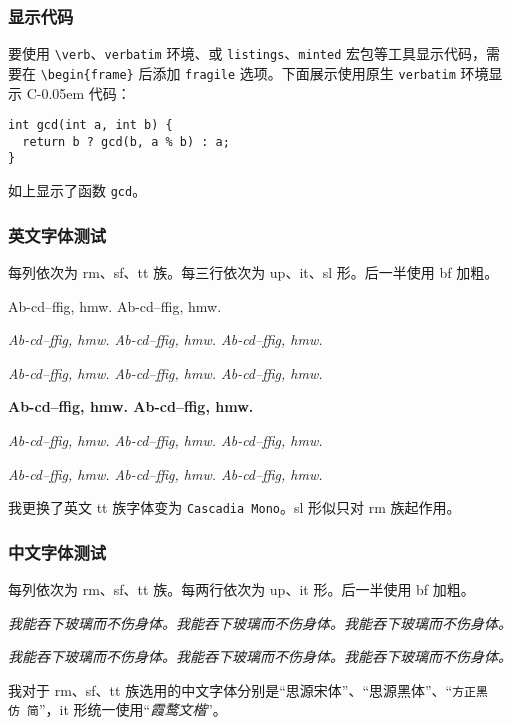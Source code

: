 \documentclass{../pkslide}
\newcommand{\Cpp}{\texorpdfstring{C\kern-0.05em\protect\raisebox{.35ex}{\textsmaller[2]{+\kern-0.05em+}}}{C++}}
\begin{document}
\begin{frame}[fragile]
  \frametitle{显示代码}
  
  要使用 \verb|\verb|、\verb|verbatim| 环境、或 \verb|listings|、\verb|minted| 宏包等工具显示代码，需要在 \verb|\begin{frame}| 后添加 \verb|fragile| 选项。下面展示使用原生 \verb|verbatim| 环境显示 \Cpp{} 代码：
  
\begin{verbatim}
int gcd(int a, int b) {
  return b ? gcd(b, a % b) : a;
}
\end{verbatim}
  
  如上显示了函数 \verb|gcd|。
\end{frame}

\begin{frame}
  \frametitle{英文字体测试}
  
  每列依次为 rm、sf、tt 族。每三行依次为 up、it、sl 形。后一半使用 bf 加粗。
  
  {%
    { {\sffamily Ab-cd--ffig, hmw.} {\ttfamily Ab-cd--ffig, hmw.}}
    
    {\itshape {\rmfamily Ab-cd--ffig, hmw.} {\sffamily Ab-cd--ffig, hmw.} {\ttfamily Ab-cd--ffig, hmw.}}
    
    {\slshape {\rmfamily Ab-cd--ffig, hmw.} {\sffamily Ab-cd--ffig, hmw.} {\ttfamily Ab-cd--ffig, hmw.}}
  }%
  
  {\bfseries%
    { {\sffamily Ab-cd--ffig, hmw.} {\ttfamily Ab-cd--ffig, hmw.}}
    
    {\itshape {\rmfamily Ab-cd--ffig, hmw.} {\sffamily Ab-cd--ffig, hmw.} {\ttfamily Ab-cd--ffig, hmw.}}
    
    {\slshape {\rmfamily Ab-cd--ffig, hmw.} {\sffamily Ab-cd--ffig, hmw.} {\ttfamily Ab-cd--ffig, hmw.}}
  }%
  
  我更换了英文 tt 族字体变为 \texttt{Cascadia Mono}。sl 形似只对 rm 族起作用。
\end{frame}

\begin{frame}
  \frametitle{中文字体测试}
  
  每列依次为 rm、sf、tt 族。每两行依次为 up、it 形。后一半使用 bf 加粗。
  
  {%
    {}
    
    {\itshape {\rmfamily{}我能吞下玻璃而不伤身体。}{\sffamily{}我能吞下玻璃而不伤身体。}{\ttfamily{}我能吞下玻璃而不伤身体。}}
    
    {\bfseries%
      {}
      
      {\itshape {\rmfamily{}我能吞下玻璃而不伤身体。}{\sffamily{}我能吞下玻璃而不伤身体。}{\ttfamily{}我能吞下玻璃而不伤身体。}}
    }%
  }%
  
  我对于 rm、sf、tt 族选用的中文字体分别是“\textrm{思源宋体}”、“\textsf{思源黑体}”、“\texttt{方正黑仿\ 简}”，it 形统一使用“\textit{霞鹜文楷}”。
\end{frame}
\end{document}

